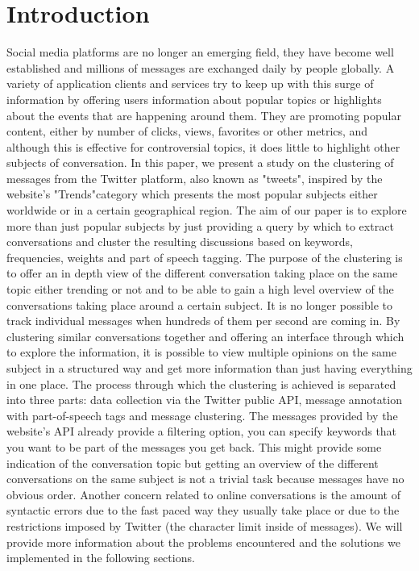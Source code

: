 \chapter{Introduction}
\label{chapter:intro}

Social media platforms are no longer an emerging field, they have become well established and millions of messages are exchanged daily by people globally. A variety of application clients and services try to keep up with this surge of information by offering users information about popular topics or highlights about the events that are happening around them. They are promoting popular content, either by number of clicks, views, favorites or other metrics, and although this is effective for controversial topics, it does little to highlight other subjects of conversation.
\newline
\newline
In this paper, we present a study on the clustering of messages from the Twitter platform, also known as "tweets", inspired by the website's "Trends"category  which presents the most popular subjects either worldwide or in a certain geographical region. The aim of our paper is to explore more than just popular subjects by just providing a query by which to extract conversations and cluster the resulting discussions based on keywords, frequencies, weights and part of speech tagging. The purpose of the clustering is to offer an in depth view of the different conversation taking place on the same topic either trending or not and to be able to gain a high level overview of the conversations taking place around a certain subject.
\newline
\newline
It is no longer possible to track individual messages when hundreds of them per second are coming in. By clustering similar conversations together and offering an interface through which to explore the information, it is possible to view multiple opinions on the same subject in a structured way and get more information than just having everything in one place.
\newline
\newline
The process through which the clustering is achieved is separated into three parts: data collection via the Twitter public API, message annotation with part-of-speech tags and message clustering. The messages provided by the website's API already provide a filtering option, you can specify keywords that you want to be part of the messages you get back. This might provide some indication of the conversation topic but getting an overview of the different conversations on the same subject is not a trivial task because messages have no obvious order. Another concern related to online conversations is the amount of syntactic errors due to the fast paced way they usually take place or due to the restrictions imposed by Twitter (the character limit inside of messages).
\newline
\newline
We will provide more information about the problems encountered and the solutions we implemented in the following sections.

